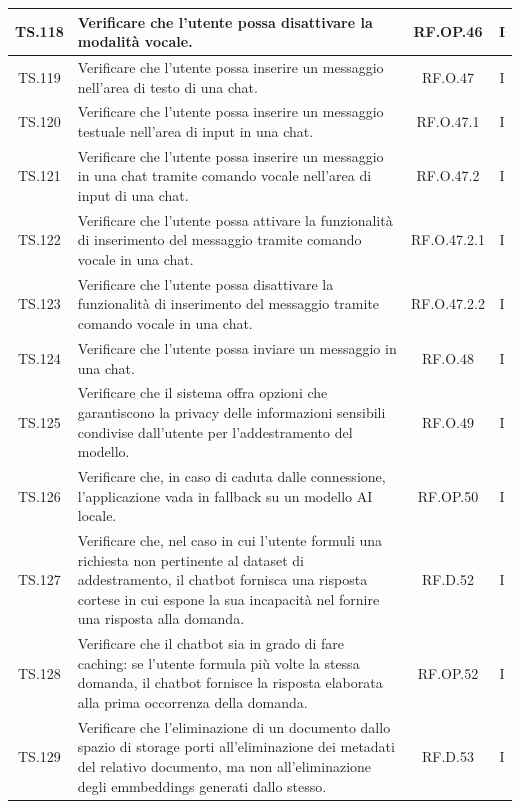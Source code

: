 \documentclass[10pt, a4paper]{article}
\begin{document}
\begin{xltabular}{\textwidth}{|c|X|c|c|}
\hline
TS.118 & Verificare che l'utente possa disattivare la modalità vocale. & RF.OP.46 & I \\
\hline
TS.119 & Verificare che l'utente possa inserire un messaggio nell’area di testo di una chat. & RF.O.47 & I \\
\hline
TS.120 & Verificare che l'utente possa inserire un messaggio testuale nell’area di input in una chat. & RF.O.47.1 & I \\
\hline
TS.121 & Verificare che l'utente possa inserire un messaggio in una chat tramite comando vocale nell’area di input di una chat. & RF.O.47.2 & I \\
\hline
TS.122 & Verificare che l'utente possa attivare la funzionalità di inserimento del messaggio tramite comando vocale in una chat. & RF.O.47.2.1 & I \\
\hline
TS.123 & Verificare che l'utente possa disattivare la funzionalità di inserimento del messaggio tramite comando vocale in una chat. & RF.O.47.2.2 & I \\
\hline
TS.124 & Verificare che l'utente possa inviare un messaggio in una chat. & RF.O.48 & I \\
\hline
TS.125 & Verificare che il sistema offra opzioni che garantiscono la privacy delle informazioni sensibili condivise dall’utente per l’addestramento del modello. & RF.O.49 & I \\
\hline
TS.126 & Verificare che, in caso di caduta dalle connessione, l’applicazione vada in fallback su un modello AI locale. & RF.OP.50 & I \\
\hline
TS.127 & Verificare che, nel caso in cui l’utente formuli una richiesta non pertinente al dataset di addestramento, il chatbot fornisca una risposta cortese in cui espone la sua incapacità nel fornire una risposta alla domanda. & RF.D.52 & I \\
\hline
TS.128 & Verificare che il chatbot sia in grado di fare caching: se l’utente formula più volte la stessa domanda, il chatbot fornisce la risposta elaborata alla prima occorrenza della domanda. & RF.OP.52 & I \\
\hline
TS.129 & Verificare che l’eliminazione di un documento dallo spazio di storage porti all’eliminazione dei metadati del relativo documento, ma non all’eliminazione degli emmbeddings generati dallo stesso. & RF.D.53 & I \\
\hline
\end{xltabular}

\end{document}

